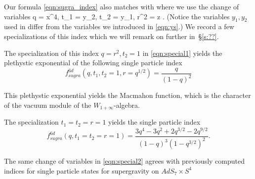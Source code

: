 Our formula \eqref{eqn:sugra_index} also matches with \cite[Eq. (3.24)]{Bhattacharya:2008zy} where we use the change of variables
\beqn
q = x^4, \quad t_1 = y_2, \quad t_2 = y_1, \quad r^2 = z .
\eeqn
(Notice the variables $y_1,y_2$ used in \cite{Bhattacharya:2008zy} differ from the variables we introduced in \eqref{eqn:ys}.)
We record a few specializations of this index which we will remark on further in~\S\ref{s:??}.

\parsec 
The specialization of this index $q=r^2, t_2=1$ in \eqref{eqn:special1} yields the plethystic exponential of the following single particle index
\[
f_{sugra}^{6d}(q, t_1, t_2=1, r = q^{1/2}) = \frac{q}{(1-q)^2}
\]

This plethystic exponential yields the Macmahon function, which is the character of the vacuum module of the $W_{1+\infty}$-algebra.

\parsec

The specialization $t_1=t_2=r=1$ yields the single particle index
\[
f_{sugra}^{6d} (q, t_1=t_2=r=1) = \frac{3 q^4 - 3 q^2 + 2 q^{3/2} - 2 q^{9/2}}{(1-q)^3 (1-q^{3/2})^2} .
\]

\parsec The same change of variables in \eqref{eqn:special2} agrees with previously computed indices for single particle states for supergravity on $AdS_{7}\times S^{4}$
